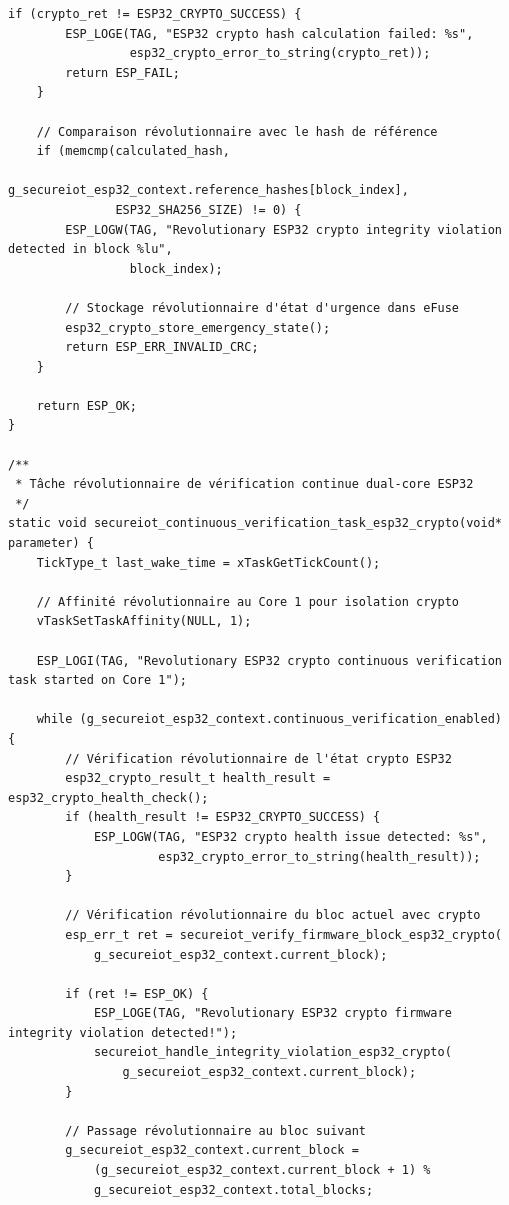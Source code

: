 \begin{lstlisting}[caption={Implémentation révolutionnaire complète du module de vérification d'intégrité ESP32 crypto intégré}]
    if (crypto_ret != ESP32_CRYPTO_SUCCESS) {
        ESP_LOGE(TAG, "ESP32 crypto hash calculation failed: %s", 
                 esp32_crypto_error_to_string(crypto_ret));
        return ESP_FAIL;
    }
    
    // Comparaison révolutionnaire avec le hash de référence
    if (memcmp(calculated_hash, 
               g_secureiot_esp32_context.reference_hashes[block_index], 
               ESP32_SHA256_SIZE) != 0) {
        ESP_LOGW(TAG, "Revolutionary ESP32 crypto integrity violation detected in block %lu", 
                 block_index);
        
        // Stockage révolutionnaire d'état d'urgence dans eFuse
        esp32_crypto_store_emergency_state();
        return ESP_ERR_INVALID_CRC;
    }
    
    return ESP_OK;
}

/**
 * Tâche révolutionnaire de vérification continue dual-core ESP32
 */
static void secureiot_continuous_verification_task_esp32_crypto(void* parameter) {
    TickType_t last_wake_time = xTaskGetTickCount();
    
    // Affinité révolutionnaire au Core 1 pour isolation crypto
    vTaskSetTaskAffinity(NULL, 1);
    
    ESP_LOGI(TAG, "Revolutionary ESP32 crypto continuous verification task started on Core 1");
    
    while (g_secureiot_esp32_context.continuous_verification_enabled) {
        // Vérification révolutionnaire de l'état crypto ESP32
        esp32_crypto_result_t health_result = esp32_crypto_health_check();
        if (health_result != ESP32_CRYPTO_SUCCESS) {
            ESP_LOGW(TAG, "ESP32 crypto health issue detected: %s", 
                     esp32_crypto_error_to_string(health_result));
        }
        
        // Vérification révolutionnaire du bloc actuel avec crypto
        esp_err_t ret = secureiot_verify_firmware_block_esp32_crypto(
            g_secureiot_esp32_context.current_block);
        
        if (ret != ESP_OK) {
            ESP_LOGE(TAG, "Revolutionary ESP32 crypto firmware integrity violation detected!");
            secureiot_handle_integrity_violation_esp32_crypto(
                g_secureiot_esp32_context.current_block);
        }
        
        // Passage révolutionnaire au bloc suivant
        g_secureiot_esp32_context.current_block = 
            (g_secureiot_esp32_context.current_block + 1) % 
            g_secureiot_esp32_context.total_blocks;
        

\end{lstlisting}
